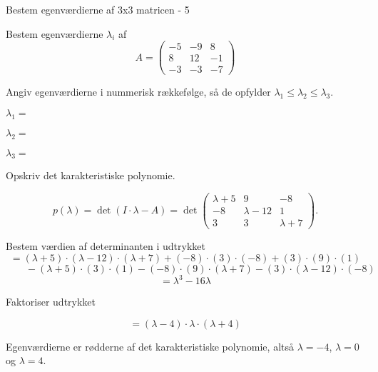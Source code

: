 \documentclass{article}
\begin{document}
\begin{exercise}{Bestem egenværdierne af 3x3 matricen - 5}

Bestem egenværdierne $\lambda_i$ af 
\[
A=\begin{pmatrix}
-5 & -9 & 8 \\
8 & 12 & -1 \\
-3 & -3 & -7
\end{pmatrix}
\]

Angiv egenværdierne i nummerisk rækkefølge, så de
opfylder $\lambda_1 \le \lambda_2 \le \lambda_3$.

$\lambda_1 = $ 

$\lambda_2 = $ 

$\lambda_3 = $ 

\hint
Opskriv det karakteristiske polynomie.

\hint
\[
p(\lambda)=\det\left(I \cdot \lambda - A \right)=\det\begin{pmatrix}
\lambda + 5 & 9 & -8 \\
-8 & \lambda - 12 & 1 \\
3 & 3 & \lambda + 7
\end{pmatrix}.
\]

\hint
Bestem værdien af determinanten i udtrykket
\[
=(\lambda+5) \cdot (\lambda-12) \cdot (\lambda+7)+(-8) \cdot (3) \cdot (-8)+(3) \cdot (9) \cdot (1)
\]
\[
\qquad -(\lambda+5) \cdot (3) \cdot (1)-(-8) \cdot (9) \cdot (\lambda+7)-(3) \cdot (\lambda-12) \cdot (-8)
\]
\[
=\lambda^3-16\lambda
\]

\hint
Faktoriser udtrykket

\hint
\[
=(\lambda-4) \cdot \lambda \cdot (\lambda+4)
\]

\hint
Egenværdierne er rødderne af det karakteristiske polynomie, 
altså
$\lambda=-4$, $\lambda=0$ og $\lambda=4$.

\end{exercise}
\end{document}
